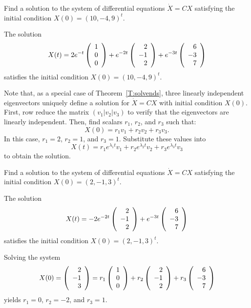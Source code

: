 \documentclass{ximera}
\begin{document}
\begin{exercise} \label{c6.1.3b}
Find a solution to the system of differential equations
$\dot{X}=CX$ satisfying the initial condition $X(0)= (10, -4, 9)^t$.

\begin{solution}
\ans The solution
\[
X(t) = 2e^{-t}\left(\begin{array}{r} 1 \\ 0 \\ 0\end{array}\right) + e^{-2t}\left(\begin{array}{r} 2 \\ -1 \\ 2\end{array}\right)
+ e^{-3t}\left(\begin{array}{r} 6 \\ -3 \\ 7\end{array}\right)
\]
satisfies the initial condition $X(0) = (10,-4,9)^t$.


\soln Note that, as a special case of Theorem~\ref{T:solvends}, three
linearly independent eigenvectors
uniquely define a solution for $\dot{X} = CX$ with initial condition
$X(0)$.  First, row reduce the matrix $(v_1|v_2|v_3)$ to verify that
the eigenvectors are linearly independent.  Then, find scalars $r_1$,
$r_2$, and $r_3$ such that:
\[
X(0) = r_1v_1 + r_2v_2 + r_3v_3.
\]
In this case, $r_1 = 2$, $r_2 = 1$, and $r_3 = 1$.  Substitute these
values into
\[
X(t) = r_1e^{\lambda_1t}v_1 + r_2e^{\lambda_2t}v_2 +
r_3e^{\lambda_3t}v_3
\]
to obtain the solution.

\end{solution}
\end{exercise}
\begin{exercise} \label{c6.1.3c}
Find a solution to the system of differential equations
$\dot{X}=CX$ satisfying the initial condition $X(0)= ( 2, -1, 3)^t$.

\begin{solution}
\ans The solution
\[
X(t) = -2e^{-2t}\left(\begin{array}{r} 2 \\ -1 \\ 2\end{array}\right) + e^{-3t}\left(\begin{array}{r} 6 \\ -3 \\ 7\end{array}\right)
\]
satisfies the initial condition $X(0) = (2,-1,3)^t$.

\soln Solving the system
\[
X(0) = \left(\begin{array}{r} 2 \\ -1 \\ 3\end{array}\right) = r_1\left(\begin{array}{r} 1 \\ 0 \\ 0\end{array}\right) +
r_2\left(\begin{array}{r} 2 \\ -1 \\ 2\end{array}\right) + r_3\left(\begin{array}{r} 6 \\ -3 \\ 7\end{array}\right)
\]
yields $r_1 = 0$, $r_2 = -2$, and $r_3 = 1$.

\end{solution}
\end{exercise}
\end{document}
